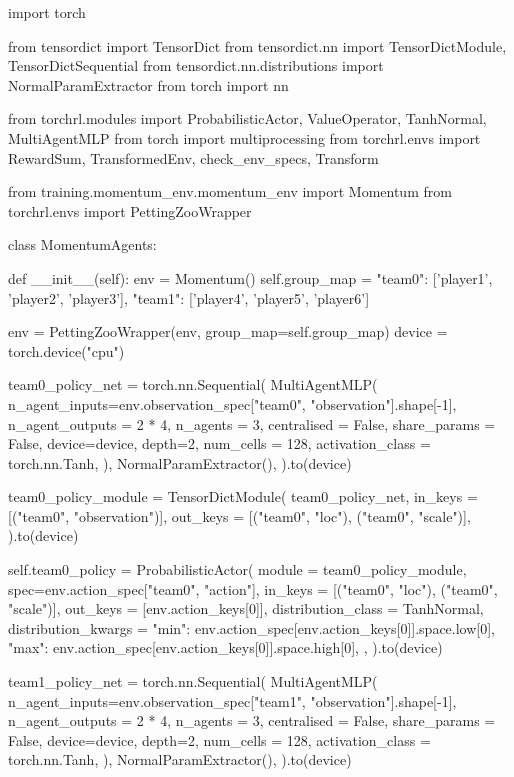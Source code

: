 \begin{mpy}
import torch

from tensordict import TensorDict
from tensordict.nn import TensorDictModule, TensorDictSequential
from tensordict.nn.distributions import NormalParamExtractor
from torch import nn

from torchrl.modules import ProbabilisticActor, ValueOperator, TanhNormal, MultiAgentMLP
from torch import multiprocessing
from torchrl.envs import RewardSum, TransformedEnv, check_env_specs, Transform

from training.momentum_env.momentum_env import Momentum
from torchrl.envs import PettingZooWrapper

class MomentumAgents:

    def __init__(self):
        env = Momentum()
        self.group_map = {"team0": ['player1', 'player2', 'player3'],
                    "team1": ['player4', 'player5', 'player6']}

        env = PettingZooWrapper(env, group_map=self.group_map)
        device = torch.device("cpu")


        team0_policy_net = torch.nn.Sequential(
            MultiAgentMLP(
                n_agent_inputs=env.observation_spec["team0", "observation"].shape[-1],
                n_agent_outputs = 2 * 4,
                n_agents = 3,
                centralised = False,
                share_params = False,
                device=device,
                depth=2,
                num_cells = 128,
                activation_class = torch.nn.Tanh,
            ),
            NormalParamExtractor(),
        ).to(device)

        team0_policy_module = TensorDictModule(
            team0_policy_net,
            in_keys = [("team0", "observation")],
            out_keys = [("team0", "loc"), ("team0", "scale")],
        ).to(device)

        self.team0_policy = ProbabilisticActor(
            module = team0_policy_module,
            spec=env.action_spec["team0", "action"],
            in_keys = [("team0", "loc"), ("team0", "scale")],
            out_keys = [env.action_keys[0]],
            distribution_class = TanhNormal,
            distribution_kwargs = {
                "min": env.action_spec[env.action_keys[0]].space.low[0],
                "max": env.action_spec[env.action_keys[0]].space.high[0],
            },
        ).to(device)

        team1_policy_net = torch.nn.Sequential(
            MultiAgentMLP(
                n_agent_inputs=env.observation_spec["team1", "observation"].shape[-1],
                n_agent_outputs = 2 * 4,
                n_agents = 3,
                centralised = False,
                share_params = False,
                device=device,
                depth=2,
                num_cells = 128,
                activation_class = torch.nn.Tanh,
            ),
            NormalParamExtractor(),
        ).to(device)


\end{mpy}
